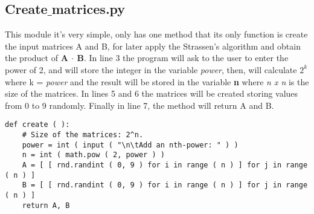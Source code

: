 \subsection{Create$\_$matrices.py}

This module it's very simple, only has one method that its only function is create the input matrices A and B, for later apply the Strassen's algorithm and obtain the product of {\bfseries A $\cdot$ B}. In line 3 the program will ask to the user to enter the power of 2, and  will store the integer in the variable {\itshape power}, then, will calculate $2^{k}$ where k = {\itshape power} and the result will be stored in the variable {\bfseries n} where {\itshape n x n} is the size of the matrices. In lines 5 and 6 the matrices will be created storing values from 0 to 9 randomly. Finally in line 7, the method will return A and B. \hfill \break

\begin{lstlisting}
def create ( ):
    # Size of the matrices: 2^n.
    power = int ( input ( "\n\tAdd an nth-power: " ) )
    n = int ( math.pow ( 2, power ) )
    A = [ [ rnd.randint ( 0, 9 ) for i in range ( n ) ] for j in range ( n ) ]
    B = [ [ rnd.randint ( 0, 9 ) for i in range ( n ) ] for j in range ( n ) ]
    return A, B
\end{lstlisting} \hfill

{\bfseries\itshape\color{carmine}{Observation:}} {\itshape{}} \hfill \break